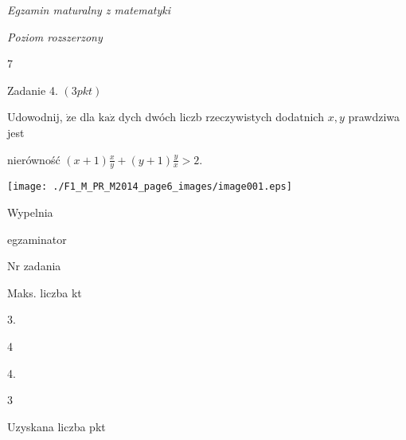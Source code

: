 \documentclass[a4paper,12pt]{article}
\begin{document}
{\it Egzamin maturalny z matematyki}

{\it Poziom rozszerzony}

7

Zadanie 4. $(3pkt)$

Udowodnij, $\dot{\mathrm{z}}\mathrm{e}$ dla $\mathrm{k}\mathrm{a}\dot{\mathrm{z}}$ dych dwóch liczb rzeczywistych dodatnich $x, y$ prawdziwa jest

nierówność $(x+1)\displaystyle \frac{x}{y}+(y+1)\frac{y}{x}>2.$
\begin{center}
\texttt{[image: ./F1\_M\_PR\_M2014\_page6\_images/image001.eps]}
\end{center}
Wypelnia

egzaminator

Nr zadania

Maks. liczba kt

3.

4

4.

3

Uzyskana liczba pkt
\end{document}
